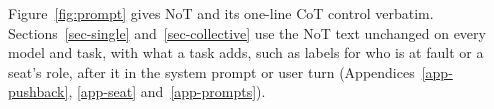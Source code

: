 Figure~\ref{fig:prompt} gives NoT and its one-line CoT control verbatim.
Sections~\ref{sec-single} and~\ref{sec-collective} use the NoT text
unchanged on every model and task, with what a task adds, such as labels for
who is at fault or a seat's role, after it in the system prompt or user turn
(Appendices~\ref{app-pushback}, \ref{app-seat} and~\ref{app-prompts}).
